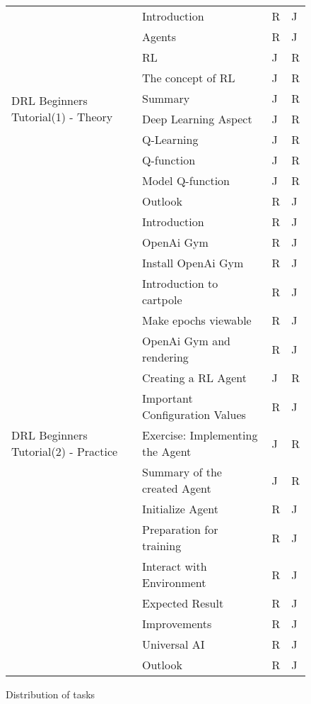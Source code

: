 \documentclass[a4paper]{article}
\begin{document}
\begin{figure}[h!]
\begin{center}
\begin{tabular}{ |l|l|l|l| }
					\multirow{10}{*}{DRL Beginners Tutorial(1) - Theory} & Introduction & R & J \\
					& Agents & R & J \\
					& RL & J & R\\ 
					& The concept of RL & J & R \\
					& Summary & J & R \\
					& Deep Learning Aspect & J & R \\
					& Q-Learning & J & R \\
					& Q-function & J & R \\
					& Model Q-function & J & R \\
					& Outlook & R & J \\
					\hline
					
					\multirow{17}{*}{DRL Beginners Tutorial(2) - Practice} & Introduction & R & J \\
					& OpenAi Gym & R & J \\
					& Install OpenAi Gym & R & J\\ 
					& Introduction to cartpole & R & J \\
					& Make epochs viewable & R & J \\
					& OpenAi Gym and rendering & R & J \\
					& Creating a RL Agent & J & R \\
					& Important Configuration Values & R & J \\
					& Exercise: Implementing the Agent & J & R \\
					& Summary of the created Agent & J & R \\
					& Initialize Agent & R & J \\
					& Preparation for training & R & J \\
					& Interact with Environment & R & J \\
					& Expected Result & R & J \\
					& Improvements & R & J \\
					& Universal AI & R & J \\
					& Outlook & R & J \\
					\hline	
				\end{tabular}
				\caption{Distribution of tasks}
				\label{tasks}
			\end{center}
		\end{figure}
		
	
\end{document}

